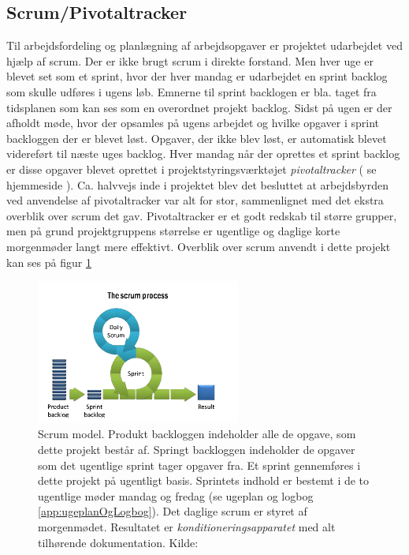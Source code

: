 \subsection{Scrum/Pivotaltracker} \label{title:scrum}
Til arbejdsfordeling og planlægning af arbejdsopgaver er projektet udarbejdet ved hjælp af scrum. Der er ikke brugt scrum i direkte forstand. Men hver uge er blevet set som et sprint, hvor der hver mandag er udarbejdet en sprint backlog som skulle udføres i ugens løb. Emnerne til sprint backlogen er bla. taget fra tidsplanen som kan ses som en overordnet projekt backlog. Sidst på ugen er der afholdt møde, hvor der opsamles på ugens arbejdet og hvilke opgaver i sprint backloggen der er blevet løst. Opgaver, der ikke blev løst, er automatisk blevet videreført til næste uges backlog. Hver mandag når der oprettes et sprint backlog er disse opgaver blevet oprettet i projektstyringsværktøjet \textit{pivotaltracker} ( se hjemmeside \cite{RefWorks:36}). Ca. halvvejs inde i projektet blev det besluttet at arbejdsbyrden ved anvendelse af pivotaltracker var alt for stor, sammenlignet med det ekstra overblik over scrum det gav. Pivotaltracker er et godt redskab til større grupper, men på grund projektgruppens størrelse er ugentlige og daglige korte morgenmøder langt mere effektivt. Overblik over scrum anvendt i dette projekt kan ses på figur \ref{fig:scrumProcess}

	\begin{figure}[H]
		\centering
		\includegraphics[width = 0.6\textwidth]{billeder/scrumProcess.png}
		\caption{Scrum model. Produkt backloggen indeholder alle de opgave, som dette projekt består af. Springt backloggen indeholder de opgaver som det ugentlige sprint tager opgaver fra. Et sprint gennemføres i dette projekt på ugentligt basis. Sprintets indhold er bestemt i de to ugentlige møder mandag og fredag (se ugeplan og logbog \ref{app:ugeplanOgLogbog}). Det daglige scrum er styret af morgenmødet. Resultatet er \textit{konditioneringsapparatet} med alt tilhørende dokumentation. Kilde: \cite{Billede:1}}\label{fig:scrumProcess}
	\end{figure}


